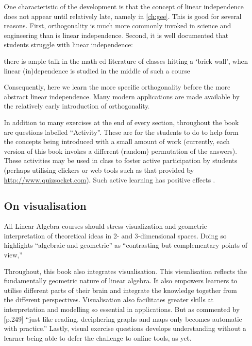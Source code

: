 One characteristic of the development is that the concept of linear independence does not appear until relatively late, namely in \autoref{ch:gee}.
This is good for several reasons.
First, orthogonality is much more commonly invoked in science and engineering than is linear independence.
Second, it is well documented that students struggle with linear independence:
\begin{quoted}{\cite{Uhlig02}}
there is ample talk in the math ed literature of classes hitting a `brick wall', when linear (in)dependence is studied in the middle of such a course
\end{quoted}
Consequently, here we learn the more specific orthogonality before the more abstract linear independence.
Many modern applications are made available by the relatively early introduction of orthogonality.

In addition to many exercises at the end of every section, throughout the book are questions labelled ``Activity''.
These are for the students to do to help form the concepts being introduced with a small amount of work (currently, each version of this book invokes a different (random) permutation of the answers).
These activities may be used in class to foster active participation by students (perhaps utilising clickers or web tools such as that provided by \url{http://www.quizsocket.com}).
Such active learning has positive effects \cite[]{ED498555}.




\subsection*{On visualisation}

\begin{quoted}{\cite[p.38]{CUPMguide2015}}
All Linear Algebra courses should stress visualization and geometric interpretation of theoretical ideas in 2- and 3-dimensional spaces. Doing so highlights ``algebraic and geometric'' as ``contrasting but complementary points of view,''
\end{quoted}


Throughout, this book also integrates visualisation.
This visualisation reflects the fundamentally geometric nature of linear algebra.  
It also empowers learners to utilise different parts of their brain and integrate the knowledge together from the different perspectives.
Visualisation also facilitates greater skills at interpretation and modelling so essential in applications.
But as commented by \cite{Fara2009} [p.249] ``just like reading, deciphering graphs and maps only becomes automatic with practice.''
Lastly, visual exercise questions develops understanding without a learner being able to defer the challenge to online tools, as yet.  

